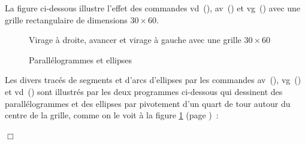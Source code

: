  La figure 
 ci-dessous
illustre l'effet des commandes
 {\idt vd\ ()},  {\idt av\ ()} et {\idt vg\ ()} avec une grille rectangulaire de dimensions $30 \times 60$.
\begin{figure}[htbp]
 \caption{Virage  à droite, avancer et virage à gauche avec une grille $30 \times 60$}
\end{figure}
\begin{figure}[htbp]
 \caption{Parallélogrammes et ellipses}
 \label{fig:parel}
\end{figure}
\begin{exemple}{\rm 
\renewcommand{\carrenoir}{\hspace{-4mm}\rule{1.5mm}{1.5mm}\hspace{2.5mm}}
Les divers tracés de segments et d'arcs d'el\-lip\-ses par les commandes {\idt av\ ()}, {\idt vg\ ()} 
et {\idt vd\ ()} sont illustrés par les deux programmes ci-dessous qui dessinent des parallélogrammes et
des ellipses par pivotement d'un quart de tour autour du centre de la grille, comme on le voit à la 
fi\-gu\-re \ref{fig:parel} (page \pageref{fig:parel})~:\hfill


\renewcommand{\carrenoir}{}
\noindent $\Box$}\end{exemple}

